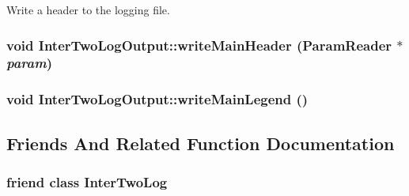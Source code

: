 \label{classInterTwoLogOutput_a4856f3d92e9d3c691f991797825d1bcc}
Write a header to the logging file. \hypertarget{classInterTwoLogOutput_ac8520bd89a481e5c17cffc75cde31671}{
\subsubsection[{writeMainHeader}]{\setlength{\rightskip}{0pt plus 5cm}void InterTwoLogOutput::writeMainHeader ({\bf ParamReader} $\ast$ {\em param})}}
\label{classInterTwoLogOutput_ac8520bd89a481e5c17cffc75cde31671}
\hypertarget{classInterTwoLogOutput_a5cc1b8305c6233048ec3b4274a2323e2}{
\subsubsection[{writeMainLegend}]{\setlength{\rightskip}{0pt plus 5cm}void InterTwoLogOutput::writeMainLegend ()}}
\label{classInterTwoLogOutput_a5cc1b8305c6233048ec3b4274a2323e2}


\subsection{Friends And Related Function Documentation}
\hypertarget{classInterTwoLogOutput_a3e7fc64b26065625ba57d692b5e411ca}{
\subsubsection[{InterTwoLog}]{\setlength{\rightskip}{0pt plus 5cm}friend class {\bf InterTwoLog}}}
\label{classInterTwoLogOutput_a3e7fc64b26065625ba57d692b5e411ca}



